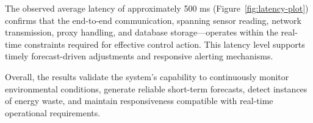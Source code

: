 \documentclass[journal]{IEEEtran}
\begin{document}
The observed average latency of approximately 500 ms (Figure~\ref{fig:latency-plot}) confirms that the end-to-end communication, spanning sensor reading, network transmission, proxy handling, and database storage—operates within the real-time constraints required for effective control action. This latency level supports timely forecast-driven adjustments and responsive alerting mechanisms.

Overall, the results validate the system’s capability to continuously monitor environmental conditions, generate reliable short-term forecasts, detect instances of energy waste, and maintain responsiveness compatible with real-time operational requirements.



\end{document}
